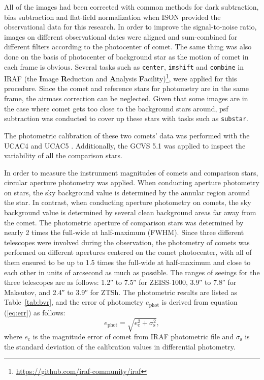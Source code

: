 All of the images had been corrected with common methods for dark subtraction, bias subtraction and flat-field normalization when ISON provided the observational data for this research. In order to improve the signal-to-noise ratio, images on different observational dates were aligned and sum-combined for different filters according to the photocenter of comet. The same thing was also done on the basis of photocenter of background star as the motion of comet in each frame is obvious. Several tasks such as \texttt{center}, \texttt{imshift} and \texttt{combine} in IRAF (the \textbf{I}mage \textbf{R}eduction and \textbf{A}nalysis \textbf{F}acility)\footnote{\url{https://github.com/iraf-community/iraf}}, were applied for this procedure. Since the comet and reference stars for photometry are in the same frame, the airmass correction can be neglected. Given that some images are in the case where comet gets too close to the background stars around, psf subtraction was conducted to cover up these stars with tasks such as \verb|substar|. 

The photometric calibration of these two comets' data was performed with the UCAC4 \citep{zacharias_fourth_2013} and UCAC5 \citep{zacharias_ucac5_2017}. Additionally, the GCVS 5.1 \citep{samus_general_2017} was applied to inspect the variability of all the comparison stars. 

In order to measure the  instrunment magnitudes of comets and comparison stars, circular aperture photometry was applied. When conducting aperture photometry on stars, the sky background value is determined by the annular region around the star. In contrast, when conducting aperture photometry on comets, the sky background value is determined by several clean background areas far away from the comet. The photometric aperture of comparison stars was determined by nearly \num{2} times the full-wide at half-maximum (FWHM). Since three different telescopes were involved during the observation, the photometry of comets was performed on different apertures centered on the comet photocenter, with all of them ensured to be up to \num{1.5} times the full-wide at half-maximum and close to each other in units of arcsecond as much as possible. 
The ranges of seeings for the three telescopes are as follows: \ang{;;1.2} to \ang{;;7.5} for ZEISS-1000, \ang{;;3.9} to \ang{;;7.8} for Maksutov, and \ang{;;2.4} to \ang{;;3.9} for ZTSh. 
The photometric results are listed as Table~\ref{tab:bvr}, and the error of photometry $e_{\mathrm{phot}}$ is derived from equation (\ref{eq:err}) as follows: 
\begin{equation}
    e_{\mathrm{phot}} = \sqrt{e_{\mathrm{c}}^{2} + \sigma_\mathrm{s}^2}, 
    \label{eq:err}
\end{equation}
where $e_\mathrm{c}$ is the magnitude error of comet from IRAF photometric file and $\sigma_\mathrm{s}$ is the standard deviation of the calibration values in differential photometry. 






